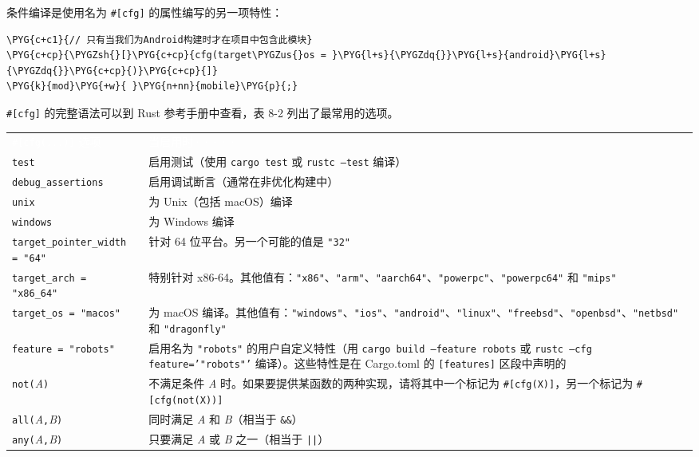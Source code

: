 条件编译是使用名为 \texttt{\#[cfg]} 的属性编写的另一项特性：

\begin{Verbatim}[commandchars=\\\{\},breaklines=true,breakanywhere=true,fontsize=\codefont,xleftmargin=17bp]
\PYG{c+c1}{// 只有当我们为Android构建时才在项目中包含此模块}
\PYG{c+cp}{\PYGZsh{}[}\PYG{c+cp}{cfg(target\PYGZus{}os = }\PYG{l+s}{\PYGZdq{}}\PYG{l+s}{android}\PYG{l+s}{\PYGZdq{}}\PYG{c+cp}{)}\PYG{c+cp}{]}
\PYG{k}{mod}\PYG{+w}{ }\PYG{n+nn}{mobile}\PYG{p}{;}
\end{Verbatim}

\texttt{\#[cfg]} 的完整语法可以到 Rust 参考手册中查看，表 8-2 列出了最常用的选项。


\myTableBegin
\begin{tabularx}{\textwidth}{@{}>{\hsize=0.785\hsize\raggedright\arraybackslash}X>{\hsize=1.215\hsize\raggedright\arraybackslash}X@{}}
\rowcolor{tabhead}\textcolor{white}{\texttt{\#[cfg(...)]} 选项} & \textcolor{white}{当启用时·····} \\
\texttt{test} & 启用测试（使用 \texttt{cargo test} 或 \texttt{rustc --test} 编译） \\
\texttt{debug\_assertions} & 启用调试断言（通常在非优化构建中） \\
\texttt{unix} & 为 Unix（包括 macOS）编译 \\
\texttt{windows} & 为 Windows 编译 \\
\texttt{target\_pointer\_width = "64"} & 针对 64 位平台。另一个可能的值是 \texttt{"32"} \\
\texttt{target\_arch = "x86\_64"} & 特别针对 x86-64。其他值有：\texttt{"x86"}、\texttt{"arm"}、\texttt{"aarch64"}、\texttt{"powerpc"}、\texttt{"powerpc64"} 和 \texttt{"mips"} \\
\texttt{target\_os = "macos"} & 为 macOS 编译。其他值有：\texttt{"windows"}、\texttt{"ios"}、\texttt{"android"}、\texttt{"linux"}、\texttt{"freebsd"}、\texttt{"openbsd"}、\texttt{"netbsd"} 和 \texttt{"dragonfly"} \\
\texttt{feature = "robots"} & 启用名为 \texttt{"robots"} 的用户自定义特性（用 \texttt{cargo build --feature robots} 或 \texttt{rustc --cfg feature='"robots"'} 编译）。这些特性是在 Cargo.toml 的 \texttt{[features]} 区段中声明的 \\
\texttt{not(}\emph{A}\texttt{)} & 不满足条件 \emph{A} 时。如果要提供某函数的两种实现，请将其中一个标记为 \texttt{\#[cfg(X)]}，另一个标记为 \texttt{\#[cfg(not(X))]} \\
\texttt{all(}\emph{A}\texttt{,}\emph{B}\texttt{)} & 同时满足 \emph{A} 和 \emph{B}（相当于 \texttt{\&\&}） \\
\texttt{any(}\emph{A}\texttt{,}\emph{B}\texttt{)} & 只要满足 \emph{A} 或 \emph{B} 之一（相当于 \texttt{||}） \\
\end{tabularx}
\myTableEnd

